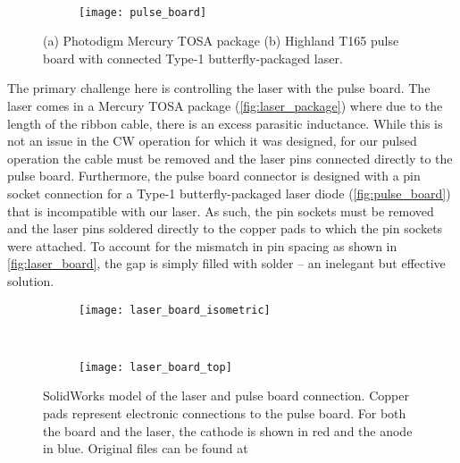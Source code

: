 \begin{figure}[tb]
    \begin{subfigure}[t]{0.49\textwidth}
        \centering
        \caption{}
        \label{fig:laser_package}
    \end{subfigure}~%
    \begin{subfigure}[t]{0.49\textwidth}
        \centering
        \texttt{[image: pulse\_board]}
        \caption{}
        \label{fig:pulse_board}
    \end{subfigure}
    \caption{(a) Photodigm Mercury TOSA package (b) Highland T165 pulse board with connected Type-1 butterfly-packaged laser.}
\end{figure}

The primary challenge here is controlling the laser with the pulse board. The laser comes in a Mercury TOSA package (\autoref{fig:laser_package}) where due to the length of the ribbon cable, there is an excess parasitic inductance. While this is not an issue in the CW operation for which it was designed, for our pulsed operation the cable must be removed and the laser pins connected directly to the pulse board. Furthermore, the pulse board connector is designed with a pin socket connection for a Type-1 butterfly-packaged
laser diode (\autoref{fig:pulse_board}) that is incompatible with our laser. As such, the pin sockets must be removed and the laser pins soldered directly to the copper pads to which the pin sockets were attached. To account for the mismatch in pin spacing as shown in \autoref{fig:laser_board}, the gap is simply filled with solder -- an inelegant but effective solution.

\begin{figure}[tb]
    \begin{subfigure}{0.49\textwidth}
        \centering
        \texttt{[image: laser\_board\_isometric]}
    \end{subfigure}~%
    \begin{subfigure}{0.49\textwidth}
        \centering
        \texttt{[image: laser\_board\_top]}
    \end{subfigure}
    \caption{SolidWorks model of the laser and pulse board connection. Copper pads represent electronic connections to the pulse board. For both the board and the laser, the cathode is shown in red and the anode in blue. Original files can be found at \coderepolink}
    \label{fig:laser_board}
\end{figure}

